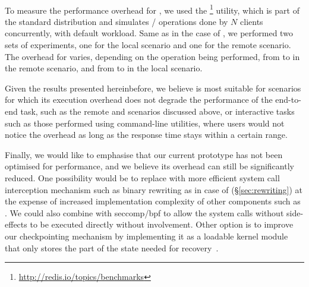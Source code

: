 \paragraph{\redis} To measure the performance overhead for \redis, we used the
\redisbenchmark\footnote{\url{http://redis.io/topics/benchmarks}} utility,
which is part of the standard \redis distribution and simulates
/ operations done by $N$ clients concurrently, with
default workload. Same as in the case of \lighttpd, we performed two sets of
experiments, one for the local scenario and one for the remote scenario. The
overhead for \redis varies, depending on the operation being performed, from
\minRedisRemote to \maxRedisRemote in the remote scenario, and from
\minRedisOver to \maxRedisOver in the local scenario. 

Given the results presented hereinbefore, we believe \mx is most suitable for
scenarios for which its execution overhead does not degrade the performance of
the end-to-end task, such as the remote \redis and \lighttpd scenarios
discussed above, or interactive tasks such as those performed using
command-line utilities, where users would not notice the overhead as long as
the response time stays within a certain range.


Finally, we would like to emphasise that our current prototype has not
been optimised for performance, and we believe its overhead can still
be significantly reduced.  
One possibility would be to replace \ptrace with more efficient system
call interception mechanism such as binary rewriting as in case of
\varan (\S\ref{sec:rewriting}) at the expense of increased
implementation complexity of other components such as \rem. We could
also combine \ptrace with \textsf{seccomp/bpf} to allow the system calls
without side-effects to be executed directly without \mxm involvement.
Other option is to improve our checkpointing mechanism by implementing
it as a loadable kernel module that only stores the part of the state
needed for recovery~\cite{flashback}.


